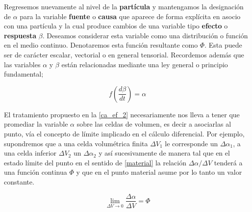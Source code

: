 \documentclass[../notas medios.tex]{subfiles}
\begin{document}
Regresemos nuevamente al nivel de la {\bf partícula} y mantengamos la
designación de $\alpha$ para la variable {\bf fuente} o {\bf causa} que aparece de forma explícita en asocio con una partícula y la cual produce cambios de una variable tipo {\bf efecto} o {\bf respuesta} $\beta$. Deseamos considerar esta variable como una distribución o función en el medio continuo.  Denotaremos esta función resultante como $\Phi$.  Esta puede ser de carácter escalar, vectorial o en general tensorial.  Recordemos además que las variables $\alpha$ y $\beta$ están relacionadas mediante una ley general o principio fundamental;

\begin{equation}
f\left( {\frac{{d\beta }}{{dt}}} \right) = \alpha
\label{ca_ef_2}
\end{equation}

El tratamiento propuesto en la \cref{ca_ef_2} necesariamente nos lleva a tener
que promediar la variable $\alpha$ sobre las celdas de volumen, es decir a
asociarlas al punto, vía el concepto de límite implicado en el cálculo
diferencial. Por ejemplo, supondremos que a una celda volumétrica finita $\Delta
{V_1}$ le corresponde un $\Delta {\alpha _1}$, a una celda inferior $\Delta
{V_2}$ un $\Delta {\alpha _2}$ y así sucesivamente de manera tal que en el estado límite del punto en el sentido de \cref{material} la relación $\Delta \alpha /\Delta V$ tenderá a una función continua $\Phi$ y que en el punto material asume por lo tanto un valor constante.

\begin{equation}
\mathop {\lim }\limits_{\Delta V \to 0} \frac{{\Delta \alpha }}{{\Delta V}} = \Phi
\label{distri}
\end{equation}
\end{document}
